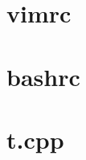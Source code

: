 \documentclass{article}
\begin{document}
\small

\section{vimrc}


\section{bashrc}


\section{t.cpp}

\end{document}
